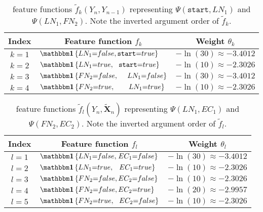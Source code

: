 \begin{table}[H]
\centering
\begin{tabular}{c l c}
 \toprule
 Index & \multicolumn{1}{c}{Feature function $f_k$} & Weight $\theta_k$ \\
 \midrule
 $k=1$ & $\identityfun\left\{LN_1{=}false,\texttt{start}{=}true\right\}$ & $-\ln(30)\approx-3.4012$ \\
 $k=2$ & $\identityfun\left\{LN_1{=}true,\ \ \texttt{start}{=}true\right\}$ & $-\ln(10)\approx-2.3026$ \\
 $k=3$ & $\identityfun\left\{FN_2{=}false,\ \ \ \ \hspace{-0.1mm}LN_1{=}false\right\}$ & $-\ln(30)\approx-3.4012$ \\
 $k=4$ & $\identityfun\left\{FN_2{=}true,\ \ \ \ \ \ \hspace{-0.1mm}LN_1{=}true\right\}$ & $-\ln(10)\approx-2.3026$\\
 \bottomrule
\end{tabular}
\caption{\Glspl{feature function} $\tilde{f}_k(Y_n,Y_{n-1})$ representing $\Psi(\texttt{start},LN_1)$ and $\Psi(LN_1,FN_2)$. Note the inverted argument order of $\tilde{f}_k$.}
\label{tab:example-linear-chain-crf-feature-functions-f-k}
\end{table}

\begin{table}[H]
\centering
\begin{tabular}{c l c}
 \toprule
 Index & \multicolumn{1}{c}{Feature function $f_l$ } & Weight $\theta_l$ \\
 \midrule
 $l=1$ & $\identityfun\left\{LN_1{=}false,\hspace{0.4mm}EC_1{=}false\right\}$ & $-\ln(30)\approx-3.4012$ \\
 $l=2$ & $\identityfun\left\{LN_1{=}true,\ \ \hspace{0.4mm}EC_1{=}true\right\}$ & $-\ln(10)\approx-2.3026$ \\
 $l=3$ & $\identityfun\left\{FN_2{=}false,EC_2{=}false\right\}$ & $-\ln(10)\approx-2.3026$ \\
 $l=4$ & $\identityfun\left\{FN_2{=}false,EC_2{=}true\right\}$ & $-\ln(20)\approx-2.9957$ \\
 $l=5$ & $\identityfun\left\{FN_2{=}true,\ \ EC_2{=}false\right\}$ & $-\ln(10)\approx-2.3026$ \\
 \bottomrule
\end{tabular}
\caption{\Glspl{feature function} $\tilde{f}_l(Y_n,\tilde{\mathbf{X}}_n)$ representing $\Psi(LN_1,EC_1)$ and $\Psi(FN_2,EC_2)$. Note the inverted argument order of $\tilde{f}_l$.}
\label{tab:example-linear-chain-crf-feature-functions-f-l}
\end{table}

